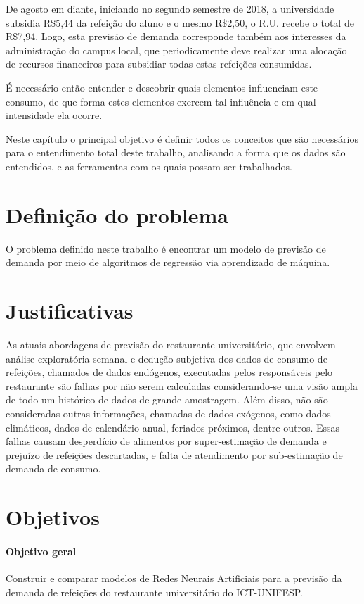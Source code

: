 \documentclass[	12pt, Times, openright, twoside, a4paper, english, brazil]{abntex2}
\begin{document}
        De agosto em diante, iniciando no segundo semestre de 2018, a universidade subsidia R\$5,44 da refeição do aluno e o mesmo R\$2,50, o R.U. recebe o total de R\$7,94. Logo, esta previsão de demanda corresponde também aos interesses da administração do campus local, que periodicamente deve realizar uma alocação de recursos financeiros para subsidiar todas estas refeições consumidas.

        É necessário então entender e descobrir quais elementos influenciam este consumo, de que forma estes elementos exercem tal influência e em qual intensidade ela ocorre.

        Neste capítulo o principal objetivo é definir todos os conceitos que são necessários para o entendimento total deste trabalho, analisando a forma que os dados são entendidos, e as ferramentas com os quais possam ser trabalhados.        

      \section{Definição do problema}
        O problema definido neste trabalho é encontrar um modelo de previsão de demanda por meio de algoritmos de regressão via aprendizado de máquina.

      \section{Justificativas}
        As atuais abordagens de previsão do restaurante universitário, que envolvem análise exploratória semanal e dedução subjetiva dos dados de consumo de refeições, chamados de dados endógenos, executadas pelos responsáveis pelo restaurante são falhas por não serem calculadas considerando-se uma visão ampla de todo um histórico de dados de grande amostragem. Além disso, não são consideradas outras informações, chamadas de dados exógenos, como dados climáticos, dados de calendário anual, feriados próximos, dentre outros. Essas falhas causam desperdício de alimentos por super-estimação de demanda e prejuízo de refeições descartadas, e falta de atendimento por sub-estimação de demanda de consumo.

      \section{Objetivos}
        \paragraph{Objetivo geral}
          Construir e comparar modelos de Redes Neurais Artificiais para a previsão da demanda de
          refeições do restaurante universitário do ICT-UNIFESP.
        
\end{document}
